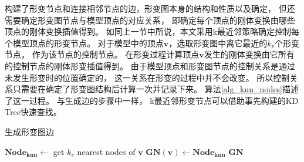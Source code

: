 构建了形变节点和连接相邻节点的边，形变图本身的结构和性质以及确定，
但还需要确定形变图节点与模型顶点的对应关系，
即确定每个顶点的刚体变换由哪些顶点的刚体变换插值得到。
如同上一节中所说，本文采用k最近邻策略确定控制每个模型顶点的形变节点。
对于模型中的顶点$\bm{v}$，选取形变图中离它最近的$k_v$个形变节点，
作为该节点的控制节点。
在形变过程计算顶点$\bm{v}$发生的刚体变换由它所有的控制节点的刚体形变插值得到。
由于模型顶点和形变图节点的控制关系是通过未发生形变时的位置确定的，
这一关系在形变的过程中并不会改变。
所以控制关系只需要在确定了形变图结构后计算一次并记录下来。
算法\ref{alg_knn_nodes}描述了这一过程。
与生成边的步骤中一样，
k最近邻形变节点可以借助事先构建的KD Tree快速查找。
\begin{algorithm}
    \caption{生成形变图边}
    \label{alg_knn_nodes}
    \begin{algorithmic}[1]
                \State $\bm{Node_{knn}} \gets$ get $k_v$ nearest nodes of $\bm{v}$
                \State $\bm{GN}(\bm{v}) \gets \bm{Node_{knn}}$
            \EndFor
            \State \Return $\bm{GN}$
        \EndFunction
    \end{algorithmic}
\end{algorithm} 

